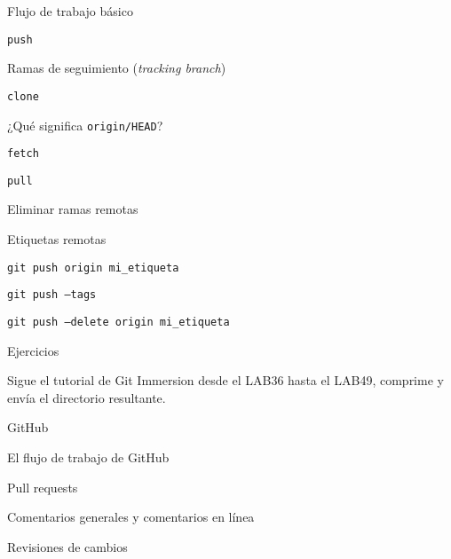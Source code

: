 \begin{longenum}
\begin{longenum}
\begin{longenum}
\begin{longenum}
            \end{longenum}
            \item Flujo de trabajo básico
            \begin{longenum}
                \item \texttt{push}
                \begin{longenum}
                    \item Ramas de seguimiento (\textit{tracking branch})
                \end{longenum}
                \item \texttt{clone}
                \begin{longenum}
                    \item ¿Qué significa \texttt{origin/HEAD}?
                \end{longenum}
                \item \texttt{fetch}
                \item \texttt{pull}
            \end{longenum}
            \item Eliminar ramas remotas
            \item Etiquetas remotas
            \begin{longenum}
                \item \texttt{git push origin mi\_etiqueta}
                \item \texttt{git push --tags}
                \item \texttt{git push --delete origin mi\_etiqueta}
            \end{longenum}
            \item Ejercicios
            \begin{longenum}
                \item Sigue el tutorial de Git Immersion desde el LAB36 hasta el LAB49, comprime y envía el directorio resultante.
            \end{longenum}
        \end{longenum}
        \item GitHub
        \begin{longenum}
            \item El flujo de trabajo de GitHub
            \item Pull requests
            \begin{longenum}
                \item Comentarios generales y comentarios en línea
                \item Revisiones de cambios

\end{longenum}
\end{longenum}
\end{longenum}
\end{longenum}
